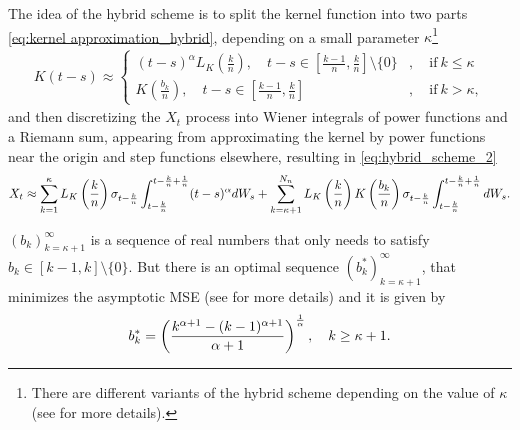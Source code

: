 The idea of the hybrid scheme  is to split the kernel function into two parts \ref{eq:kernel approximation_hybrid}, depending on a small parameter $\kappa$\footnote{There are different variants of the hybrid scheme depending on the value of $\kappa$ (see \cite{bennedsen2017hybrid} for more details).} 
\begin{align}\label{eq:kernel approximation_hybrid}
 K(t-s)\approx\begin{cases}
              (t-s)^\alpha L_K\left(\frac{k}{n}\right), \quad t-s \in \left[\frac{k-1}{n},\frac{k}{n}\right] \setminus \{0\}&, \quad \text{if} \: k \le \kappa \\
           K\left(\frac{b_k}{n}\right) , \quad t-s \in \left[\frac{k-1}{n},\frac{k}{n}\right] &, \quad \text{if}\:  k >\kappa,
            \end{cases}
\end{align}
and then discretizing the  $X_t$ process into Wiener integrals of power functions and a Riemann sum, appearing from approximating the kernel by power functions near the origin and step functions elsewhere, resulting in \ref{eq:hybrid_scheme_2}
\begin{align}\label{eq:hybrid_scheme_2}
X_t \approx \sum_{k=1}^\kappa    L_K\left(\frac{k}{n}\right) \sigma_{t-\frac{k}{n}} \int_{t-\frac{k}{n}}^{t-\frac{k}{n}+\frac{1}{n}} (t-s)^\alpha   dW_s+ \sum_{k=\kappa+1}^{N_n}  L_K\left(\frac{k}{n}\right)  K\left(\frac{b_k}{n}\right) \sigma_{t-\frac{k}{n}} \int_{t-\frac{k}{n}}^{t-\frac{k}{n}+\frac{1}{n}}   dW_s .
\end{align}
\begin{remark}
$\left(b_k\right)_{k=\kappa+1}^\infty$ is a sequence of real numbers that only needs to satisfy  $b_k \in \left[k-1, k\right]\setminus \{0\}$. But there is an optimal sequence $\left(b_k^\ast\right)_{k=\kappa+1}^\infty$, that
minimizes the asymptotic MSE (see \cite{bennedsen2017hybrid} for more details) and it is given by
$$ b_k^\ast=\left(\frac{k^{\alpha+1}-(k-1)^{\alpha+1 }}{\alpha+1}\right)^{\frac{1}{\alpha}},\quad k \ge \kappa+1 .$$
\end{remark}

